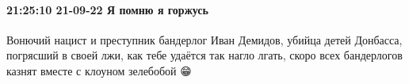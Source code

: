  
 
 
 
 

\paragraph{21:25:10 21-09-22 Я помню я горжусь}

Вонючий нацист и преступник бандерлог Иван Демидов, убийца детей Донбасса,
погрясший в своей лжи, как тебе удаётся так нагло лгать, скоро всех бандерлогов
казнят вместе с клоуном зелебобой 😁🤣
